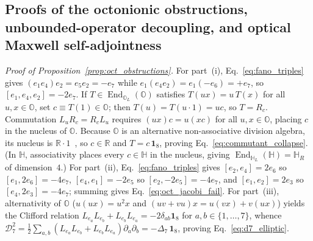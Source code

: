 \documentclass[aps,prd,onecolumn,tightenlines,nofootinbib,notitlepage,11pt,floatfix]{revtex4-2}
\theoremstyle{indentedtheorem}
\begin{document}
\subsection{Proofs of the octonionic obstructions, unbounded-operator decoupling, and optical Maxwell self-adjointness}
\label{sup:constraints_proofs}

\emph{Proof of Proposition~\ref{prop:oct_obstructions}.}
For part~(i), Eq.~\eqref{eq:fano_triples} gives $(e_1 e_4)e_2 = e_5 e_2 = -e_7$ while $e_1(e_4 e_2) = e_1(-e_6) = +e_7$, so $[e_1,e_4,e_2] = -2e_7$. If $T\in\operatorname{End}_{\mathbb{O}_L}(\mathbb{O})$ satisfies $T(ux) = u\,T(x)$ for all $u,x\in\mathbb{O}$, set $c\equiv T(1)\in\mathbb{O}$; then $T(u) = T(u\cdot 1) = uc$, so $T = R_c$. Commutation $L_u R_c = R_c L_u$ requires $(ux)c = u(xc)$ for all $u,x\in\mathbb{O}$, placing $c$ in the nucleus of $\mathbb{O}$. Because $\mathbb{O}$ is an alternative non-associative division algebra, its nucleus is $\mathbb{R}\cdot 1$~\citep{Baez2002Octonions}, so $c\in\mathbb{R}$ and $T = c\,\mathbf{1}_8$, proving Eq.~\eqref{eq:commutant_collapse}. (In $\mathbb{H}$, associativity places every $c\in\mathbb{H}$ in the nucleus, giving $\operatorname{End}_{\mathbb{H}_L}(\mathbb{H}) = \mathbb{H}_R$ of dimension~$4$.) For part~(ii), Eq.~\eqref{eq:fano_triples} gives $[e_2,e_4]=2e_6$ so $[e_1,2e_6]=-4e_7$, $[e_4,e_1]=-2e_5$ so $[e_2,-2e_5]=-4e_7$, and $[e_1,e_2]=2e_3$ so $[e_4,2e_3]=-4e_7$; summing gives Eq.~\eqref{eq:oct_jacobi_fail}. For part~(iii), alternativity of $\mathbb{O}$ ($u(ux)=u^2 x$ and $(uv+vu)x=u(vx)+v(ux)$) yields the Clifford relation $L_{e_a}L_{e_b}+L_{e_b}L_{e_a} = -2\delta_{ab}\mathbf{1}_8$ for $a,b\in\{1,\dots,7\}$, whence $\mathcal{D}_7^2 = \tfrac{1}{2}\sum_{a,b}(L_{e_a}L_{e_b}+L_{e_b}L_{e_a})\partial_a\partial_b = -\Delta_7\,\mathbf{1}_8$, proving Eq.~\eqref{eq:d7_elliptic}.
\end{document}
